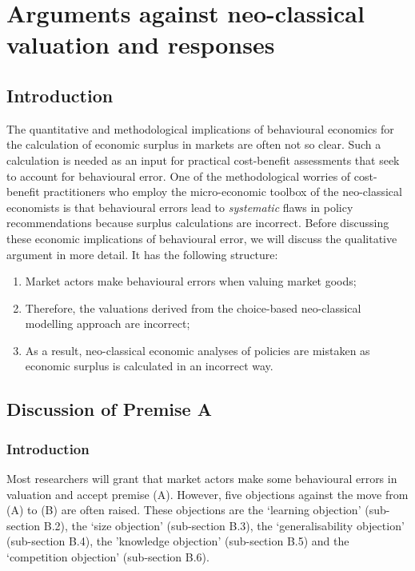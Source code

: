 \documentclass[
]{book}
\providecommand{\tightlist}{%
  \setlength{\itemsep}{0pt}\setlength{\parskip}{0pt}}
\begin{document}
\hypertarget{arguments}{%
\section{Arguments against neo-classical valuation and responses}\label{arguments}}

\hypertarget{introduction-5}{%
\subsection{Introduction}\label{introduction-5}}

The quantitative and methodological implications of behavioural economics for the calculation of economic surplus in markets are often not so clear. Such a calculation is needed as an input for practical cost-benefit assessments that seek to account for behavioural error. One of the methodological worries of cost-benefit practitioners who employ the micro-economic toolbox of the neo-classical economists is that behavioural errors lead to \emph{systematic} flaws in policy recommendations because surplus calculations are incorrect. Before discussing these economic implications of behavioural error, we will discuss the qualitative argument in more detail. It has the following structure:

\begin{enumerate}
\def\labelenumi{(\Alph{enumi})}
\tightlist
\item
  Market actors make behavioural errors when valuing market goods;
\item
  Therefore, the valuations derived from the choice-based neo-classical modelling approach are incorrect;
\item
  As a result, neo-classical economic analyses of policies are mistaken as economic surplus is calculated in an incorrect way.
\end{enumerate}

\hypertarget{discussion-of-premise-a}{%
\subsection{Discussion of Premise A}\label{discussion-of-premise-a}}

\hypertarget{introduction-6}{%
\subsubsection{Introduction}\label{introduction-6}}

Most researchers will grant that market actors make some behavioural errors in valuation and accept premise (A). However, five objections against the move from (A) to (B) are often raised. These objections are the `learning objection' (sub-section B.2), the `size objection' (sub-section B.3), the `generalisability objection' (sub-section B.4), the 'knowledge objection' (sub-section B.5) and the `competition objection' (sub-section B.6).
\end{document}
